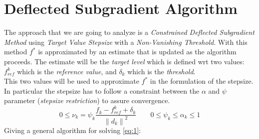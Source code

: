 \documentclass[12pt]{article}
\newcommand{\norm}[1]{\left\lVert#1\right\rVert}
\begin{document}
	\section{Deflected Subgradient Algorithm}
    The approach that we are going to analyze is a \textit{Constrained Deflected Subgradient Method} using \textit{Target Value Stepsize} with a \textit{Non-Vanishing Threshold}. With this method $f^*$ is approximated by an estimate that is updated as the algorithm proceeds. The estimate will be the  \emph{target level} which is defined wrt two values: $f_{ref}^k$ which is the \emph{reference value}, and $\delta_k$ which is the \emph{threshold}.\\
    This two values will be used to approximate $f^*$ in the formulation of the stepsize. In particular the stepsize has to follow a constraint between the $\alpha$ and $\psi$ parameter (\textit{stepsize restriction}) to assure convergence.
    \begin{equation}
        0 \leq \nu_k = \psi_k \frac{f_k - f_{ref}^k + \delta_k}{\norm{d_k}^2} \qquad 0 \leq \psi_k \leq \alpha_k \leq 1 
    \end{equation}
    \pagebreak
    \newline
    Giving a general algorithm for solving \eqref{eq:1}:\\
    \newline
\end{document}
